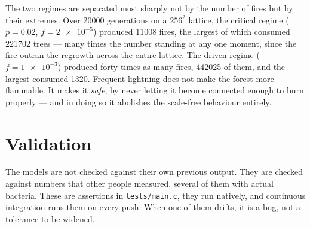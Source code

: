 \documentclass[11pt,a4paper]{article}
\begin{document}
The two regimes are separated most sharply not by the number of fires but by
their extremes. Over \num{20000} generations on a $256^2$ lattice, the critical
regime ($p=\num{0.02}$, $f=\num{2e-5}$) produced \num{11008} fires, the largest
of which consumed \num{221702} trees --- many times the number standing at any
one moment, since the fire outran the regrowth across the entire lattice. The
driven regime ($f=\num{1e-3}$) produced forty times as many fires,
\num{442025} of them, and the largest consumed \num{1320}. Frequent lightning
does not make the forest more flammable. It makes it \emph{safe}, by never
letting it become connected enough to burn properly --- and in doing so it
abolishes the scale-free behaviour entirely.

\section{Validation}
\label{sec:validation}

The models are not checked against their own previous output. They are checked
against numbers that other people measured, several of them with actual bacteria.
These are assertions in \texttt{tests/main.c}, they run natively, and continuous
integration runs them on every push. When one of them drifts, it is a bug, not a
tolerance to be widened.
\end{document}

